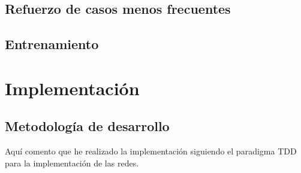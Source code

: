 \documentclass[10pt,a4paper, twocolumn]{report}
\begin{document}
\section{Refuerzo de casos menos frecuentes}
\section{Entrenamiento}
\chapter{Implementación}
\section{Metodología de desarrollo}
Aquí comento que he realizado la implementación siguiendo el paradigma TDD para la implementación de las redes.
\end{document}
